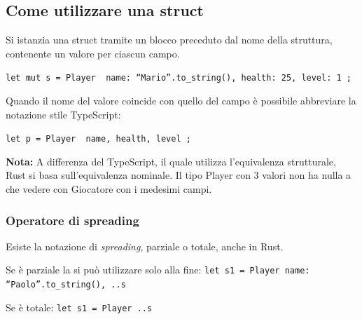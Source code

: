 




\subsection{Come utilizzare una struct}

Si istanzia una struct tramite un blocco preceduto dal nome della struttura, contenente
un valore per ciascun campo.

\begin{center}
  \centering
  \texttt{let mut s = Player { name: “Mario”.to_string(), health: 25, level: 1 };}
\end{center}


Quando il nome del valore coincide con quello del campo è possibile abbreviare la notazione
stile TypeScript:


\begin{center}
  \centering
  \texttt{let p = Player { name, health, level };}
\end{center}

\noindent
\begin{tcolorbox}
  \textbf{Nota:} A differenza del TypeScript, il quale utilizza l'equivalenza strutturale,
  Rust si basa sull'equivalenza nominale. Il tipo Player con 3 valori non ha nulla a che
  vedere con Giocatore con i medesimi campi.
\end{tcolorbox}

\subsubsection{Operatore di spreading}

Esiste la notazione di \textit{spreading}, parziale o totale, anche in Rust.\newline

Se è parziale la si può utilizzare solo alla fine: \texttt{let s1 = Player {name: “Paolo”.to_string(), ..s}}

Se è totale: \texttt{let s1 = Player {..s}}

